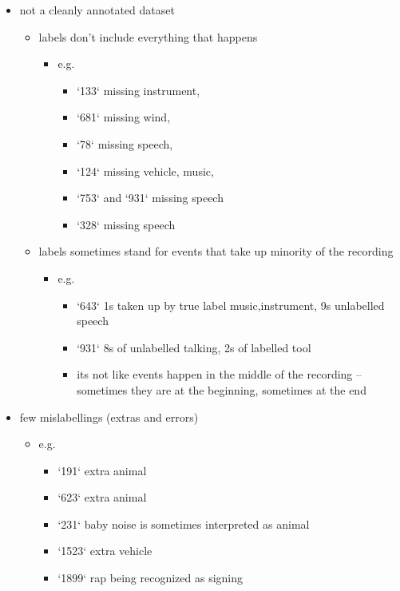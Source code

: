 \documentclass[11pt]{article}
\begin{document}
\begin{itemize}
  \item not a cleanly annotated dataset
  \begin{itemize}
    \item labels don't include everything that happens
    \begin{itemize}
        \item e.g.
        \begin{itemize}
            \item `133` missing instrument,
            \item `681` missing wind,
            \item `78` missing speech,
            \item `124` missing vehicle, music,
            \item `753` and `931` missing speech
            \item `328` missing speech
        \end{itemize}
    \end{itemize}
    \item labels sometimes stand for events that take up minority of the recording
    \begin{itemize}
        \item e.g.
        \begin{itemize}
            \item `643` 1s taken up by true label music,instrument, 9s unlabelled speech
            \item `931` 8s of unlabelled talking, 2s of labelled tool
            \item its not like events happen in the middle of the recording -- sometimes they are at the beginning, sometimes at the end
        \end{itemize}
    \end{itemize}
  \end{itemize}

  \item few mislabellings (extras and errors)
  \begin{itemize}
    \item e.g.
    \begin{itemize}
        \item `191` extra animal
        \item `623` extra animal
        \item `231` baby noise is sometimes interpreted as animal
        \item `1523` extra vehicle
        \item `1899` rap being recognized as signing
    \end{itemize}
  \end{itemize}


\end{itemize}
\end{document}
